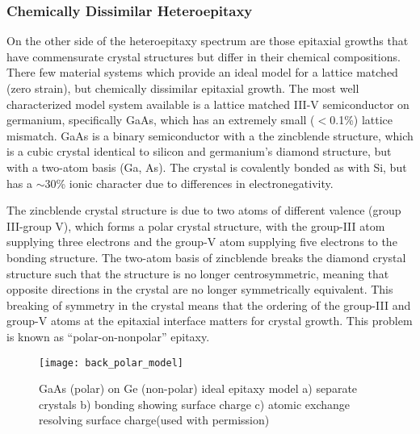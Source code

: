 \subsubsection{Chemically Dissimilar Heteroepitaxy}
On the other side of the heteroepitaxy spectrum are those epitaxial growths that have commensurate crystal structures but differ in their chemical compositions. There few material systems which provide an ideal model for a lattice matched (zero strain), but chemically dissimilar epitaxial growth. The most well characterized model system available is a lattice matched III-V semiconductor on germanium, specifically GaAs, which has an extremely small ($<$0.1\%) lattice mismatch. GaAs is a binary semiconductor with a the zincblende structure, which is a cubic crystal identical to silicon and germanium's diamond structure, but with a two-atom basis (Ga, As). The crystal is covalently bonded as with Si, but has a $\sim$30\% ionic character due to differences in electronegativity\cite{Christensen1987}.

The zincblende crystal structure is due to two atoms of different valence (group III-group V), which forms a polar crystal structure, with the group-III atom supplying three electrons and the group-V atom supplying five electrons to the bonding structure. The two-atom basis of zincblende breaks the diamond crystal structure such that the structure is no longer centrosymmetric, meaning that opposite directions in the crystal are no longer symmetrically equivalent. This breaking of symmetry in the crystal means that the ordering of the group-III and group-V atoms at the epitaxial interface matters for crystal growth. This problem is known as ``polar-on-nonpolar'' epitaxy\cite{Biegelsen1992,Kroemer1987}.
\begin{figure}
    \centering
    \texttt{[image: back\_polar\_model]}
    \caption[Atomic model of polar on non-polar epitaxy]{\label{fig:back_polar_model}GaAs (polar) on Ge (non-polar) ideal epitaxy model a) separate crystals b) bonding showing surface charge c) atomic exchange resolving surface charge\cite{Biegelsen1992}(used with permission)}
\end{figure}

